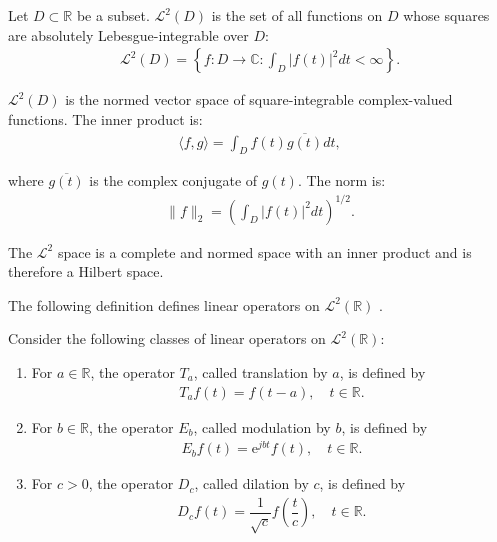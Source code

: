 \begin{definition} \label{def:L2space}
Let $D \subset \mathbb{R}$ be a subset. $\mathcal{L}^2(D)$ is the set of all functions on $D$ whose squares are absolutely Lebesgue-integrable over $D$:
\begin{align*}
\mathcal{L}^2(D) = \left\{ f: D \to \mathbb{C}: \int_D |f(t)|^2 dt < \infty \right\}.
\end{align*}

$\mathcal{L}^2(D)$ is the normed vector space of square-integrable complex-valued functions. The inner product is:
\begin{align*}
\langle f,g \rangle =  \int_D f(t) \overline{g(t)} dt,
\end{align*}

where $\overline{g(t)}$ is the complex conjugate of $g(t)$. The norm is:
\begin{align*}
\|f\|_2 = \left( \int_D |f(t)|^2 dt \right)^{1/2}.
\end{align*}

The $\mathcal{L}^2$ space is a complete and normed space with an inner product and is therefore a Hilbert space.

\end{definition}

The following definition defines linear operators on $\mathcal{L}^2(\mathbb{R})$ \cite{page 120, FSE2010}.

\begin{definition} \label{def:TMD}
Consider the following classes of linear operators on $\mathcal{L}^2(\mathbb{R})$:
\begin{enumerate}
\item For $a \in \mathbb{R}$, the operator $T_a$, called translation by $a$, is defined by
\begin{align*}
T_a f(t) = f(t-a), \quad t \in \mathbb{R}.
\end{align*}

\item For $b \in \mathbb{R}$, the operator $E_b$, called modulation by $b$, is defined by
\begin{align*}
E_b f(t) = \text{e}^{j b t} f(t), \quad t \in \mathbb{R}.
\end{align*}

\item For $c > 0$, the operator $D_c$, called dilation by $c$, is defined by
\begin{align*}
D_c f(t) = \dfrac{1}{\sqrt{c}} f\left( \dfrac{t}{c} \right), \quad t \in \mathbb{R}.
\end{align*}
\end{enumerate}
\end{definition}

